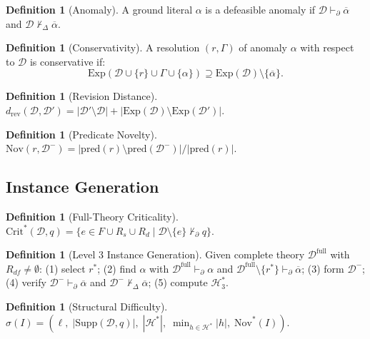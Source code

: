 \documentclass{article}
\theoremstyle{definition}
\newtheorem{definition}[theorem]{Definition}
\newcommand{\D}{\mathcal{D}}
\newcommand{\Dm}{\mathcal{D}^{-}}
\newcommand{\Dfull}{\mathcal{D}^{\mathrm{full}}}
\newcommand{\Hgold}{\mathcal{H}^{*}}
\newcommand{\Rgold}{\mathcal{H}^{*}_3}
\newcommand{\Rs}{R_s}
\newcommand{\Rd}{R_d}
\newcommand{\Rdf}{R_{df}}
\newcommand{\pred}{\mathrm{pred}}
\newcommand{\Supp}{\mathrm{Supp}}
\newcommand{\CritStar}{\mathrm{Crit}^{*}}
\newcommand{\Exp}{\mathrm{Exp}}
\newcommand{\Nov}{\mathrm{Nov}}
\newcommand{\pDelta}{\vdash_{\Delta}}
\newcommand{\pPartial}{\vdash_{\partial}}
\newcommand{\comp}[1]{\overline{#1}}
\begin{document}
\begin{definition}[Anomaly]\label{def:anomclass}
A ground literal $\alpha$ is a defeasible anomaly if $\D \pPartial \comp{\alpha}$ and $\D \not\pDelta \comp{\alpha}$.
\end{definition}

\begin{definition}[Conservativity]\label{def:conserv}
A resolution $(r, \Gamma)$ of anomaly $\alpha$ with respect to $\D$ is conservative if:
\[
    \Exp(\D \cup \{r\} \cup \Gamma \cup \{\alpha\}) \supseteq \Exp(\D) \setminus \{\comp{\alpha}\}.
\]
\end{definition}

\begin{definition}[Revision Distance]\label{def:revdist}
$d_{\mathrm{rev}}(\D, \D') = |\D' \setminus \D| + |\Exp(\D) \setminus \Exp(\D')|$.
\end{definition}

\begin{definition}[Predicate Novelty]\label{def:novelty}
$\Nov(r, \Dm) = |\pred(r) \setminus \pred(\Dm)| / |\pred(r)|$.
\end{definition}

\subsection{Instance Generation}

\begin{definition}[Full-Theory Criticality]\label{def:fullcrit}
$\CritStar(\D, q) = \{e \in F \cup \Rs \cup \Rd \mid \D \setminus \{e\} \not\pPartial q\}$.
\end{definition}

\begin{definition}[Level 3 Instance Generation]\label{def:level3gen}
Given complete theory $\Dfull$ with $\Rdf \neq \emptyset$: (1) select $r^*$; (2) find $\alpha$ with $\Dfull \pPartial \alpha$ and $\Dfull \setminus \{r^*\} \pPartial \comp{\alpha}$; (3) form $\Dm$; (4) verify $\Dm \pPartial \comp{\alpha}$ and $\Dm \not\pDelta \comp{\alpha}$; (5) compute $\Rgold$.
\end{definition}

\begin{definition}[Structural Difficulty]\label{def:structdiff}
$\sigma(I) = (\ell,\; |\Supp(\D, q)|,\; |\Hgold|,\; \min_{h \in \Hgold} |h|,\; \Nov^*(I))$.
\end{definition}


\end{document}
